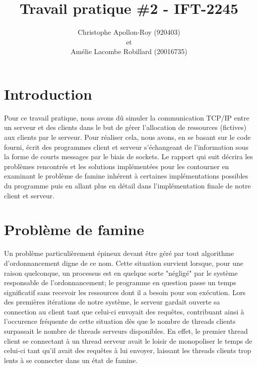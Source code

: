 \documentclass[11pt]{article}
\title{Travail pratique \#2 - IFT-2245}
\author{Christophe Apollon-Roy (920403) \\et \\Amélie Lacombe Robillard (20016735)}
\begin{document}
\maketitle
\section*{Introduction}
\setlength{\parindent}{20pt}
Pour ce travail pratique, nous avons dû simuler la communication TCP/IP entre un serveur et des clients dans le but de gérer l'allocation de 
ressources (fictives) aux clients par le serveur. Pour réaliser cela, nous avons, en se basant sur le code fourni, écrit des programmes client et 
serveur s'échangeant de l'information sous la forme de courts messages par le biais de sockets. Le rapport qui suit décrira les problèmes 
rencontrés et les solutions implémentées pour les contourner en examinant le problème de famine inhérent à certaines implémentations possibles du 
programme puis en allant plus en détail dans l'implémentation finale de notre client et serveur.
\\
\section*{Problème de famine}
\setlength{\parindent}{20pt}
Un problème particulièrement épineux devant être géré par tout algorithme d'ordonnancement digne de ce nom. Cette situation survient lorsque, pour 
une raison quelconque, un processus est en quelque sorte "négligé" par le système responsable de l'ordonnancement; le programme en question passe 
un temps significatif sans recevoir les ressources dont il a besoin pour son exécution. Lors des premières itérations de notre système, le 
serveur gardait ouverte sa connection au client tant que celui-ci envoyait des requêtes, contribuant ainsi à l'occurence fréquente de cette 
situation dès que le nombre de threads clients surpassait le nombre de threads serveurs disponibles. En effet, le premier thread client se 
connectant à un thread serveur avait le loisir de monopoliser le temps de celui-ci tant qu'il avait des requêtes à lui envoyer, laissant les 
threads clients trop lents à se connecter dans un état de famine. 
 
\end{document}
